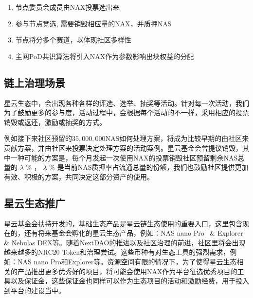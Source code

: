 \begin{enumerate}[\hspace{1cm}(a)]
  \item 节点委员会成员由NAX投票选出来
  \item 参与节点竞选, 需要销毁相应量的NAX，并质押NAS
  \item 节点将分多个赛道，以体现社区多样性
  \item 主网PoD共识算法将引入NAX作为参数影响出块权益的分配
\end{enumerate}

\subsection{链上治理场景}
星云生态中，会出现各种各样的评选、选举、抽奖等活动。针对每一次活动，我们为了鼓励更多的参与度，活动过程中，会根据每个活动的不一样，采用相应的投票销毁或返还，激励或抽奖的方式。

例如接下来社区预留的$35,000,000$NAS如何处理方案，将成为比较早期的由社区来贡献方案，并由社区来投票决定处理方案的活动案例。星云基金会曾提议销毁，其中一种可能的方案是，每个月发起一次使用NAX的投票销毁社区预留剩余NAS总量的 \(\lambda\) \% ， \(\lambda\) \% 是当前NAS质押率占流通总量的份额，我们也鼓励社区提供更加有效、积极的方案，共同决定这部分资产的使用。

\subsection{星云生态推广}
星云基金会扶持开发的，基础生态产品是星云链生态使用的重要入口，这里包含现在的，还有将来基金会孵化的星云生态产品，例如：NAS nano Pro~\cite{NASnano} \& Explorer~\cite{explorer} \& Nebulas DEX等。随着NextDAO的推进以及社区治理的前进，社区里将会出现越来越多的NRC20 Token和治理尝试。这些币种有对生态工具的强烈需求，例如：NAS nano Pro和Explorer等。资源空间有限的情况下，为了使得星云生态相关的产品推出更多优秀好的项目，将可能会使用NAX作为平台征选优秀项目的工具以及保证金，这些保证金也同样可以作为生态项目的活动和激励经费，用于投入到平台的建设当中。
